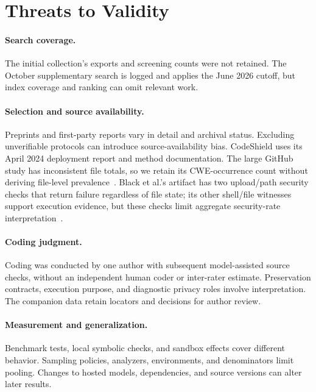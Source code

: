 \documentclass[acmsmall,screen,review,nonacm]{acmart}
\begin{document}
\section{Threats to Validity}
\label{sec:limitations}

\paragraph{Search coverage.}
The initial collection's exports and screening counts were not retained. The October supplementary search is logged and applies the June 2026 cutoff, but index coverage and ranking can omit relevant work.

\paragraph{Selection and source availability.}
Preprints and first-party reports vary in detail and archival status. Excluding unverifiable protocols can introduce source-availability bias. CodeShield uses its April 2024 deployment report and method documentation. The large GitHub study has inconsistent file totals, so we retain its CWE-occurrence count without deriving file-level prevalence~\cite{largescale2025vulnerabilities}. Black et al.'s artifact has two upload/path security checks that return failure regardless of file state; its other shell/file witnesses support execution evidence, but these checks limit aggregate security-rate interpretation~\cite{black2025balancing}.

\paragraph{Coding judgment.}
Coding was conducted by one author with subsequent model-assisted source checks, without an independent human coder or inter-rater estimate. Preservation contracts, execution purpose, and diagnostic privacy roles involve interpretation. The companion data retain locators and decisions for author review.

\paragraph{Measurement and generalization.}
Benchmark tests, local symbolic checks, and sandbox effects cover different behavior. Sampling policies, analyzers, environments, and denominators limit pooling. Changes to hosted models, dependencies, and source versions can alter later results.
\end{document}
